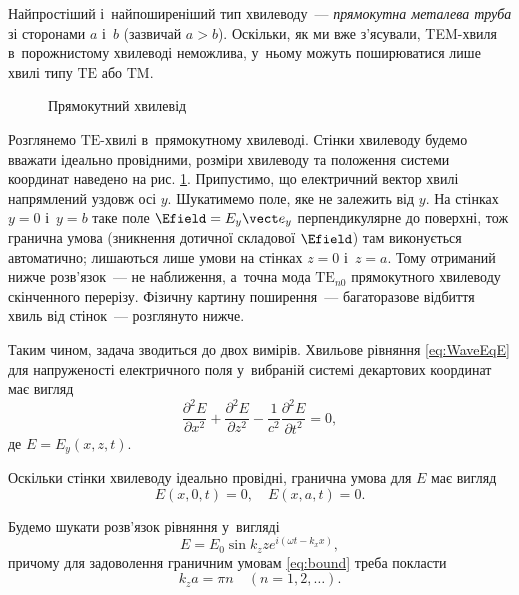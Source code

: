 Найпростіший і~найпоширеніший тип хвилеводу~--- \emph{прямокутна металева труба} зі сторонами $a$ і~$b$ (зазвичай $a > b$). Оскільки, як ми вже з'ясували, TEM-хвиля в~порожнистому хвилеводі неможлива, у~ньому можуть поширюватися лише хвилі типу $\text{TE}$ або $\text{TM}$.


\begin{figure}[h!]\centering
	\caption{Прямокутний хвилевід}
	\label{pic:waveguide}
\end{figure}


Розглянемо $\text{TE}$-хвилі в~прямокутному хвилеводі. Стінки хвилеводу будемо вважати ідеально провідними, розміри хвилеводу та положення системи координат наведено на рис. \ref{pic:waveguide}. Припустимо, що електричний вектор хвилі напрямлений уздовж осі $y$. Шукатимемо поле, яке не залежить від $y$. На стінках $y=0$ і~$y=b$ таке поле $\Efield=E_y\vect e_y$ перпендикулярне до
поверхні, тож гранична умова (зникнення дотичної складової $\Efield$) там виконується автоматично; лишаються лише умови на
стінках $z=0$ і~$z=a$. Тому отриманий нижче розв'язок~--- не наближення, а~точна мода $\text{TE}_{n0}$ прямокутного хвилеводу
скінченного перерізу. Фізичну картину поширення~--- багаторазове відбиття хвиль від стінок~--- розглянуто нижче.

Таким чином, задача зводиться до двох вимірів. Хвильове рівняння \eqref{eq:WaveEqE} для напруженості електричного поля у~вибраній системі декартових координат має вигляд
\begin{equation}\label{eq:wave_eqn}
	\frac{\partial^2 E}{\partial x^2} + \frac{\partial^2 E}{\partial z^2} - \frac{1}{c^2} \frac{\partial^2 E}{\partial t^2} = 0,
\end{equation}
де $E = E_y (x, z, t)$.

Оскільки стінки хвилеводу ідеально провідні, гранична умова для $E$ має вигляд
\begin{equation}\label{eq:bound}
	E (x, 0, t) = 0, \quad E (x, a, t) = 0.
\end{equation}

Будемо шукати розв'язок рівняння у~вигляді
\begin{equation}\label{eq:TE_sol}
	E = E_0 \sin k_z z e^{i (\omega t - k_x x)},
\end{equation}
причому для задоволення граничним умовам \eqref{eq:bound} треба покласти
\begin{equation}
	k_z a = \pi n \quad (n = 1, 2, \dots).
\end{equation}

